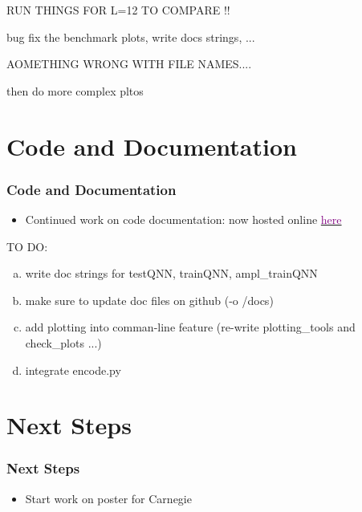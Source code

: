\documentclass{beamer}
\begin{document}
\begin{frame}
RUN THINGS FOR L=12 TO COMPARE !!


bug fix the benchmark plots, write docs strings, ...

AOMETHING WRONG WITH FILE NAMES....

then do more complex pltos 
\end{frame}

\section{Code and Documentation}

\begin{frame}
\frametitle{Code and Documentation}
\begin{itemize}
\item Continued work on code documentation: now hosted online \href{https://david-f-amorim.github.io/PQC_function_evaluation/pqcprep.html}{\textcolor{purple}{here}}
\end{itemize}
TO DO:
\begin{enumerate}[(a)]
\item write doc strings for testQNN, trainQNN, ampl\_trainQNN 
\item make sure to update doc files on github (-o /docs)
\item add plotting into comman-line feature (re-write plotting\_tools and check\_plots ...) 
\item integrate encode.py
\end{enumerate}
\end{frame}

\section{Next Steps}

\begin{frame}
\frametitle{Next Steps}

\begin{itemize}
\item Start work on poster for Carnegie 
\end{itemize}

\end{frame}
\end{document}
